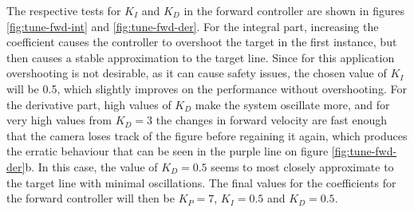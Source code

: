 The respective tests for $K_I$ and $K_D$ in the forward controller are shown in figures \ref{fig:tune-fwd-int} and \ref{fig:tune-fwd-der}.
For the integral part, increasing the coefficient causes the controller to overshoot the target in the first instance, but then causes a stable approximation to the target line.
Since for this application overshooting is not desirable, as it can cause safety issues, the chosen value of $K_I$ will be 0.5, which slightly improves on the performance without overshooting.
For the derivative part, high values of $K_D$ make the system oscillate more, and for very high values from $K_D=3$ the changes in forward velocity are fast enough that the camera loses track of the figure before regaining it again, which produces the erratic behaviour that can be seen in the purple line on figure \ref{fig:tune-fwd-der}b.
In this case, the value of $K_D=0.5$ seems to most closely approximate to the target line with minimal oscillations.
The final values for the coefficients for the forward controller will then be $K_P=7$, $K_I=0.5$ and $K_D=0.5$.



